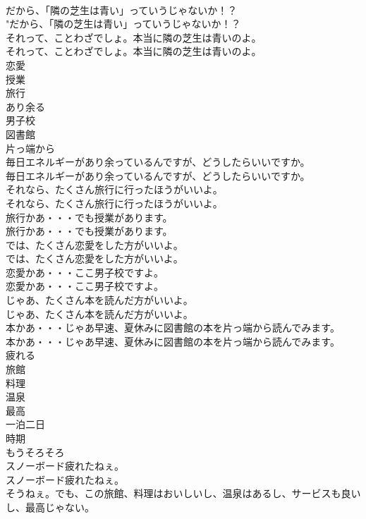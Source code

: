 \documentclass[8pt]{extreport}
\begin{document}
\begin{CJK}{UTF8}{min}
\\	だから、「隣の芝生は青い」っていうじゃないか！？	
\\	"だから、「隣の芝生は青い」っていうじゃないか！？ 
\\	それって、ことわざでしょ。本当に隣の芝生は青いのよ。	
\\	それって、ことわざでしょ。本当に隣の芝生は青いのよ。 
\\	恋愛
\\	授業
\\	旅行
\\	あり余る
\\	男子校
\\	図書館
\\	片っ端から
\\	毎日エネルギーがあり余っているんですが、どうしたらいいですか。	
\\	毎日エネルギーがあり余っているんですが、どうしたらいいですか。 
\\	それなら、たくさん旅行に行ったほうがいいよ。	
\\	それなら、たくさん旅行に行ったほうがいいよ。 
\\	旅行かあ・・・でも授業があります。	
\\	旅行かあ・・・でも授業があります。 
\\	では、たくさん恋愛をした方がいいよ。	
\\	では、たくさん恋愛をした方がいいよ。 
\\	恋愛かあ・・・ここ男子校ですよ。	
\\	恋愛かあ・・・ここ男子校ですよ。 
\\	じゃあ、たくさん本を読んだ方がいいよ。	
\\	じゃあ、たくさん本を読んだ方がいいよ。 
\\	本かあ・・・じゃあ早速、夏休みに図書館の本を片っ端から読んでみます。	
\\	本かあ・・・じゃあ早速、夏休みに図書館の本を片っ端から読んでみます。 
\\	疲れる
\\	旅館
\\	料理
\\	温泉
\\	最高
\\	一泊二日
\\	時期
\\	もうそろそろ
\\	スノーボード疲れたねぇ。	
\\	スノーボード疲れたねぇ。 
\\	そうねぇ。でも、この旅館、料理はおいしいし、温泉はあるし、サービスも良いし、最高じゃない。	

\end{CJK}
\end{document}
